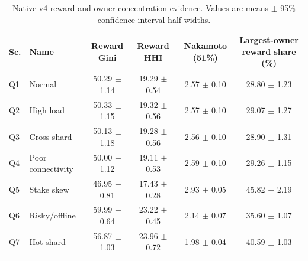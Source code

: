 \begin{table}[pos=t]
\centering
\caption{Native v4 reward and owner-concentration evidence. Values are means $\pm$ 95\% confidence-interval half-widths.}
\label{tab:cpn_decentralisation_native}
\scriptsize
\setlength{\tabcolsep}{4.0pt}
\begin{tabular}{llcccc}
\toprule
\textbf{Sc.} & \textbf{Name} & \textbf{Reward Gini} & \textbf{Reward HHI} & \textbf{Nakamoto (51\%)} & \textbf{Largest-owner reward share (\%)}\\
\midrule
Q1 & Normal & 50.29 $\pm$ 1.14 & 19.29 $\pm$ 0.54 & 2.57 $\pm$ 0.10 & 28.80 $\pm$ 1.23\\
Q2 & High load & 50.33 $\pm$ 1.15 & 19.32 $\pm$ 0.56 & 2.57 $\pm$ 0.10 & 29.07 $\pm$ 1.27\\
Q3 & Cross-shard & 50.13 $\pm$ 1.18 & 19.28 $\pm$ 0.56 & 2.56 $\pm$ 0.10 & 28.90 $\pm$ 1.31\\
Q4 & Poor connectivity & 50.00 $\pm$ 1.12 & 19.11 $\pm$ 0.53 & 2.59 $\pm$ 0.10 & 29.26 $\pm$ 1.15\\
Q5 & Stake skew & 46.95 $\pm$ 0.81 & 17.43 $\pm$ 0.28 & 2.93 $\pm$ 0.05 & 45.82 $\pm$ 2.19\\
Q6 & Risky/offline & 59.99 $\pm$ 0.64 & 23.22 $\pm$ 0.45 & 2.14 $\pm$ 0.07 & 35.60 $\pm$ 1.07\\
Q7 & Hot shard & 56.87 $\pm$ 1.03 & 23.96 $\pm$ 0.72 & 1.98 $\pm$ 0.04 & 40.59 $\pm$ 1.03\\
\bottomrule
\end{tabular}
\end{table}